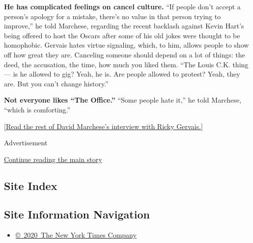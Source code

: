 \textbf{He has complicated feelings on cancel culture.} ``If people
don't accept a person's apology for a mistake, there's no value in that
person trying to improve,'' he told Marchese, regarding the recent
backlash against Kevin Hart's being offered to host the Oscars after
some of his old jokes were thought to be homophobic. Gervais hates
virtue signaling, which, to him, allows people to show off how great
they are. Canceling someone should depend on a lot of things: the deed,
the accusation, the time, how much you liked them. ``The Louis C.K.
thing --- is he allowed to gig? Yeah, he is. Are people allowed to
protest? Yeah, they are. But you can't change history.''

\textbf{Not everyone likes ``The Office.''} ``Some people hate it,'' he
told Marchese, ``which is comforting.''

{[}\href{https://www.nytimes3xbfgragh.onion/interactive/2019/03/19/magazine/ricky-gervais-after-life-comedy-twitter.html}{Read
the rest of David Marchese's interview with Ricky Gervais.}{]}

Advertisement

\protect\hyperlink{after-bottom}{Continue reading the main story}

\hypertarget{site-index}{%
\subsection{Site Index}\label{site-index}}

\hypertarget{site-information-navigation}{%
\subsection{Site Information
Navigation}\label{site-information-navigation}}

\begin{itemize}
\tightlist
\item
  \href{https://help.nytimes3xbfgragh.onion/hc/en-us/articles/115014792127-Copyright-notice}{©~2020~The
  New York Times Company}
\end{itemize}

